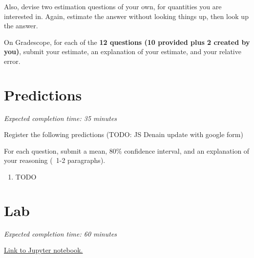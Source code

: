 \documentclass[11pt]{article}
\begin{document}
Also, devise two estimation questions of your own, for quantities you are interested in. Again, estimate the answer without looking things up, then look up the answer.

On Gradescope, for each of the \textbf{12 questions (10 provided plus 2 created by you)}, submit your estimate, an explanation of your estimate, and your relative error.


\section*{Predictions}

\emph{Expected completion time: 35 minutes}

Register the following predictions (TODO: JS Denain update with google form)



For each question, submit a mean, 80\% confidence interval, and an explanation of your reasoning (~1-2 paragraphs).

\begin{enumerate}
	\item TODO
\end{enumerate}

\section*{Lab}

\emph{Expected completion time: 60 minutes}

\href{https://datahub.berkeley.edu/hub/user-redirect/git-pull?repo=https%3A%2F%2Fgithub.com%2Fjs-d%2Fstat-157-260-website&urlpath=tree%2Fstat-157-260-website%2Fhw%2Fhw2%2Fhw2_lab.ipynb&branch=main}{Link to Jupyter notebook.}
\end{document}
